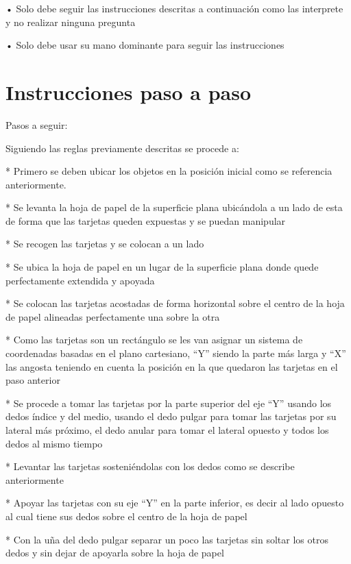 \documentclass{article}
\begin{document}
•	Solo debe seguir las instrucciones descritas a continuación como las interprete y no realizar ninguna pregunta

•	Solo debe usar su mano dominante para seguir las instrucciones






\newpage\section{Instrucciones paso a paso} \label{contenido}









Pasos a seguir:

Siguiendo las reglas previamente descritas se procede a:

*	Primero se deben ubicar los objetos en la posición inicial como se referencia anteriormente.

*	Se levanta la hoja de papel de la superficie plana ubicándola a un lado de esta de forma que las tarjetas queden expuestas y se puedan manipular

*	Se recogen las tarjetas y se colocan a un lado

*	Se ubica la hoja de papel en un lugar de la superficie plana donde quede perfectamente extendida y apoyada

*	Se colocan las tarjetas acostadas de forma horizontal sobre el centro de la hoja de papel alineadas perfectamente una sobre la otra

*	Como las tarjetas son un rectángulo se les van asignar un sistema de coordenadas basadas en el plano cartesiano, “Y” siendo la parte más larga y “X” las angosta teniendo en cuenta la posición en la que quedaron las tarjetas en el paso anterior

*	Se procede a tomar las tarjetas por la parte superior del eje “Y” usando los dedos índice y del medio, usando el dedo pulgar para tomar las tarjetas por su lateral más próximo, el dedo anular para tomar el lateral opuesto y todos los dedos al mismo tiempo

*	Levantar las tarjetas sosteniéndolas con los dedos como se describe anteriormente

*	Apoyar las  tarjetas con su eje “Y” en la parte inferior, es decir al lado opuesto al cual tiene sus dedos sobre el centro de la hoja de papel

*	 Con la uña del dedo pulgar separar un poco las tarjetas sin soltar los otros dedos y sin dejar de apoyarla sobre la hoja de papel
\end{document}
